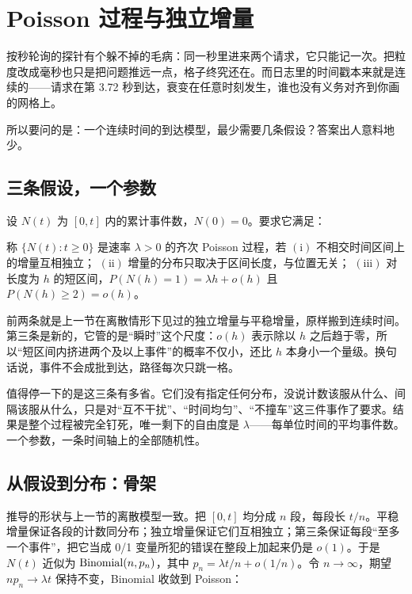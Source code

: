 \section{Poisson 过程与独立增量}
\label{sec:06-Random-Processes/02-Counting-Processes/02}

按秒轮询的探针有个躲不掉的毛病：同一秒里进来两个请求，它只能记一次。把粒度改成毫秒也只是把问题推远一点，格子终究还在。而日志里的时间戳本来就是连续的——请求在第 3.72 秒到达，衰变在任意时刻发生，谁也没有义务对齐到你画的网格上。

所以要问的是：一个连续时间的到达模型，最少需要几条假设？答案出人意料地少。

\subsection{三条假设，一个参数}

设 \(N(t)\) 为 \([0,t]\) 内的累计事件数，\(N(0)=0\)。要求它满足：

\begin{definition}
称 \(\{N(t):t\ge0\}\) 是速率 \(\lambda>0\) 的齐次 Poisson 过程，若
\((\mathrm i)\) 不相交时间区间上的增量互相独立；
\((\mathrm{ii})\) 增量的分布只取决于区间长度，与位置无关；
\((\mathrm{iii})\) 对长度为 \(h\) 的短区间，\(P(N(h)=1)=\lambda h+o(h)\) 且 \(P(N(h)\ge2)=o(h)\)。
\end{definition}

前两条就是上一节在离散情形下见过的独立增量与平稳增量，原样搬到连续时间。第三条是新的，它管的是``瞬时''这个尺度：\(o(h)\) 表示除以 \(h\) 之后趋于零，所以``短区间内挤进两个及以上事件''的概率不仅小，还比 \(h\) 本身小一个量级。换句话说，事件不会成批到达，路径每次只跳一格。

值得停一下的是这三条有多省。它们没有指定任何分布，没说计数该服从什么、间隔该服从什么，只是对``互不干扰''、``时间均匀''、``不撞车''这三件事作了要求。结果是整个过程被完全钉死，唯一剩下的自由度是 \(\lambda\)——每单位时间的平均事件数。一个参数，一条时间轴上的全部随机性。

\subsection{从假设到分布：骨架}

推导的形状与上一节的离散模型一致。把 \([0,t]\) 均分成 \(n\) 段，每段长 \(t/n\)。平稳增量保证各段的计数同分布；独立增量保证它们互相独立；第三条保证每段``至多一个事件''，把它当成 0/1 变量所犯的错误在整段上加起来仍是 \(o(1)\)。于是 \(N(t)\) 近似为 \(\operatorname{Binomial}(n,p_n)\)，其中 \(p_n=\lambda t/n+o(1/n)\)。令 \(n\to\infty\)，期望 \(np_n\to\lambda t\) 保持不变，Binomial 收敛到 Poisson：

